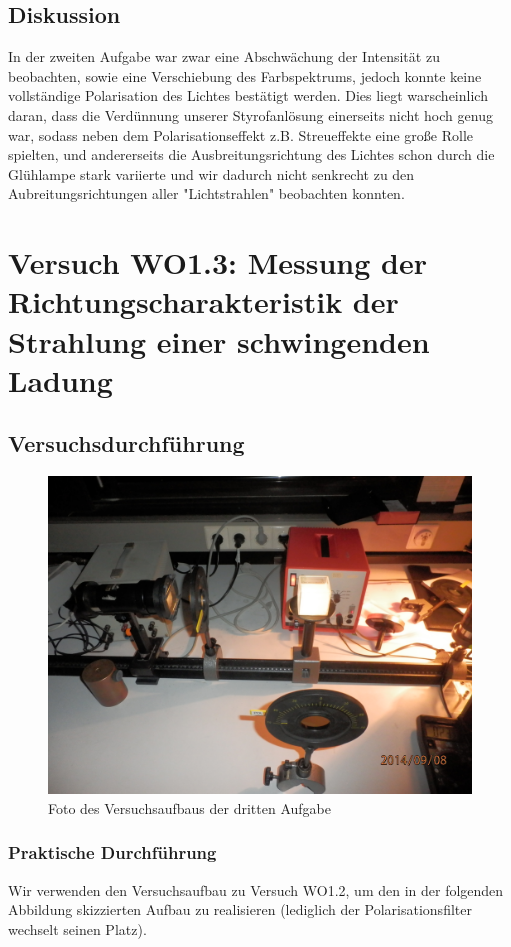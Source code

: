 \documentclass[12pt]{scrartcl}
\begin{document}
\subsection{Diskussion}
In der zweiten Aufgabe war zwar eine Abschwächung der Intensität zu beobachten, sowie eine Verschiebung des Farbspektrums, jedoch konnte keine vollständige Polarisation des Lichtes bestätigt werden. Dies liegt warscheinlich daran, dass die Verdünnung unserer Styrofanlösung einerseits nicht hoch genug war, sodass neben dem Polarisationseffekt z.B. Streueffekte eine große Rolle spielten, und andererseits die Ausbreitungsrichtung des Lichtes schon durch die Glühlampe stark variierte und wir dadurch nicht senkrecht zu den Aubreitungsrichtungen aller "Lichtstrahlen" beobachten konnten. 


\section{Versuch WO1.3:
Messung der Richtungscharakteristik der Strahlung einer schwingenden Ladung}
\subsection{Versuchsdurchführung}

\begin{figure}[H]
\centering
    \includegraphics[scale = 0.1]{aufgabe_3.JPG}
  	\caption[Foto des Versuchsaufbaus der dritten Aufgabe]{Foto des Versuchsaufbaus der dritten Aufgabe}
  \label{fig:aufgabe_3}
\end{figure}

\subsubsection{Praktische Durchführung}
Wir verwenden den Versuchsaufbau zu Versuch WO1.2, um den in der folgenden Abbildung skizzierten Aufbau zu realisieren (lediglich der Polarisationsfilter wechselt seinen Platz).
\end{document}
